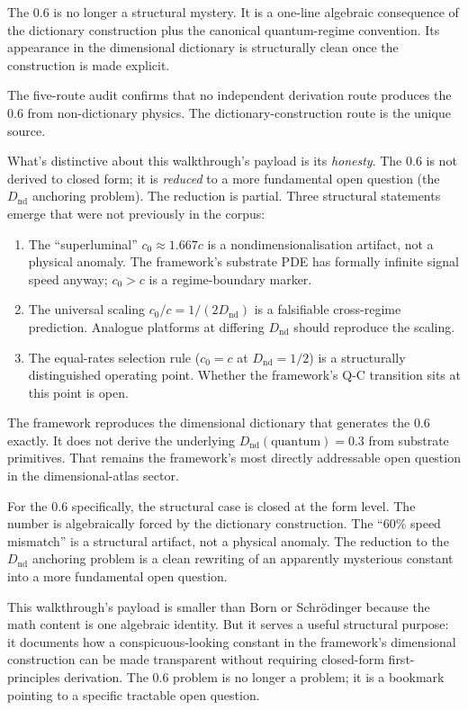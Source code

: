 \documentclass[11pt,a4paper]{article}
\begin{document}
The 0.6 is no longer a structural mystery. It is a one-line algebraic consequence of the dictionary construction plus the canonical quantum-regime convention. Its appearance in the dimensional dictionary is structurally clean once the construction is made explicit.

The five-route audit confirms that no independent derivation route produces the 0.6 from non-dictionary physics. The dictionary-construction route is the unique source.

What's distinctive about this walkthrough's payload is its \emph{honesty}. The 0.6 is not derived to closed form; it is \emph{reduced} to a more fundamental open question (the $D_\mathrm{nd}$ anchoring problem). The reduction is partial. Three structural statements emerge that were not previously in the corpus:

\begin{enumerate}[noitemsep]
\item The ``superluminal'' $c_0 \approx 1.667 c$ is a nondimensionalisation artifact, not a physical anomaly. The framework's substrate PDE has formally infinite signal speed anyway; $c_0 > c$ is a regime-boundary marker.
\item The universal scaling $c_0/c = 1/(2 D_\mathrm{nd})$ is a falsifiable cross-regime prediction. Analogue platforms at differing $D_\mathrm{nd}$ should reproduce the scaling.
\item The equal-rates selection rule ($c_0 = c$ at $D_\mathrm{nd} = 1/2$) is a structurally distinguished operating point. Whether the framework's Q-C transition sits at this point is open.
\end{enumerate}

The framework reproduces the dimensional dictionary that generates the 0.6 exactly. It does not derive the underlying $D_\mathrm{nd}(\mathrm{quantum}) = 0.3$ from substrate primitives. That remains the framework's most directly addressable open question in the dimensional-atlas sector.

For the 0.6 specifically, the structural case is closed at the form level. The number is algebraically forced by the dictionary construction. The ``60\% speed mismatch'' is a structural artifact, not a physical anomaly. The reduction to the $D_\mathrm{nd}$ anchoring problem is a clean rewriting of an apparently mysterious constant into a more fundamental open question.

This walkthrough's payload is smaller than Born or Schr\"odinger because the math content is one algebraic identity. But it serves a useful structural purpose: it documents how a conspicuous-looking constant in the framework's dimensional construction can be made transparent without requiring closed-form first-principles derivation. The 0.6 problem is no longer a problem; it is a bookmark pointing to a specific tractable open question.
\end{document}
